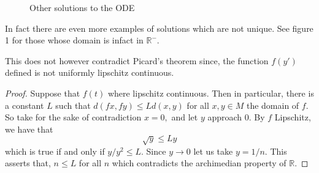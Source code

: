 \documentclass[letter]{article}
\newenvironment{menumerate}{%
  \edef\backupindent{\the\parindent}%
  \enumerate%
  \setlength{\parindent}{\backupindent}%
}{\endenumerate}
\begin{document}
\begin{menumerate}
      \begin{figure}
          \centering

        \caption{Other solutions to the ODE}
        \label{fig:test}
        \end{figure}
    In fact there are even more examples of solutions which are not unique. See figure 1 for those whose domain
    is infact in $\mathbb{R}^-.$

    This does not however contradict Picard's theorem since, the function $f(y')$ defined is not
    uniformly lipschitz continuous. 
    \begin{proof}
        Suppose that $f(t)$ where lipschitz continuous. Then in particular, there is a constant
        $L$ such that $d(fx,fy) \leq Ld(x,y)$ for all $x,y \in M$ the domain of $f.$ So take for the sake
        of contradiction $x = 0,$ and let $y$ approach $0.$ By $f$ Lipschitz, we have that 
        $$\sqrt{y} \leq Ly$$
        which is true if and only if $y/y^2 \leq L.$ Since $y \to 0$ let us take $y = 1/n.$ This asserts that,
        $n \leq L$ for all $n$ which contradicts the archimedian property of $\mathbb{R}.$ 
    \end{proof}


\end{menumerate}
\end{document}
